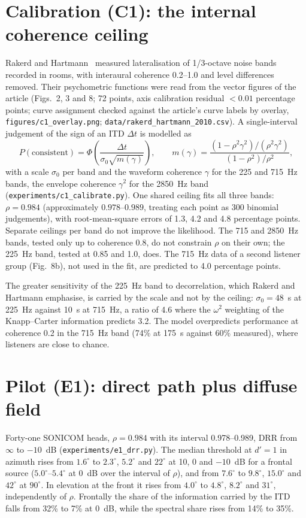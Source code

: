 \documentclass[10pt]{article}
\theoremstyle{definition}
\begin{document}
\section{Calibration (C1): the internal coherence ceiling}\label{sec:c1}
Rakerd and Hartmann~\cite{rakerd2010} measured lateralisation of 1/3-octave noise bands recorded in rooms, with interaural coherence 0.2--1.0 and level differences removed. Their psychometric functions were read from the vector figures of the article (Figs.~2, 3 and 8; 72 points, axis calibration residual $<0.01$ percentage points; curve assignment checked against the article's curve labels by overlay, \texttt{figures/c1\_overlay.png}; \texttt{data/rakerd\_hartmann\_2010.csv}). A single-interval judgement of the sign of an ITD $\Delta t$ is modelled as
\begin{equation}
P(\text{consistent})=\Phi\!\left(\frac{\Delta t}{\sigma_0\sqrt{m(\gamma)}}\right),\qquad
m(\gamma)=\frac{(1-\rho^2\gamma^2)/(\rho^2\gamma^2)}{(1-\rho^2)/\rho^2},
\end{equation}
with a scale $\sigma_0$ per band and the waveform coherence $\gamma$ for the 225 and 715~Hz bands, the envelope coherence $\gamma^2$ for the 2850~Hz band (\texttt{experiments/c1\_calibrate.py}). One shared ceiling fits all three bands: $\rho=0.984$ (approximately $0.978$--$0.989$, treating each point as 300 binomial judgements), with root-mean-square errors of 1.3, 4.2 and 4.8 percentage points. Separate ceilings per band do not improve the likelihood. The 715 and 2850~Hz bands, tested only up to coherence 0.8, do not constrain $\rho$ on their own; the 225~Hz band, tested at 0.85 and 1.0, does. The 715~Hz data of a second listener group (Fig.~8b), not used in the fit, are predicted to 4.0 percentage points.

The greater sensitivity of the 225~Hz band to decorrelation, which Rakerd and Hartmann emphasise, is carried by the scale and not by the ceiling: $\sigma_0=48$~\textmu s at 225~Hz against 10~\textmu s at 715~Hz, a ratio of 4.6 where the $\omega^2$ weighting of the Knapp--Carter information predicts 3.2. The model overpredicts performance at coherence 0.2 in the 715~Hz band (74\% at 175~\textmu s against 60\% measured), where listeners are close to chance.

\section{Pilot (E1): direct path plus diffuse field}
Forty-one SONICOM heads, $\rho=0.984$ with its interval 0.978--0.989, DRR from $\infty$ to $-10$~dB (\texttt{experiments/e1\_drr.py}). The median threshold at $d'=1$ in azimuth rises from $1.6^\circ$ to $2.3^\circ$, $5.2^\circ$ and $22^\circ$ at 10, 0 and $-10$~dB for a frontal source ($5.0^\circ$--$5.4^\circ$ at 0~dB over the interval of $\rho$), and from $7.6^\circ$ to $9.8^\circ$, $15.0^\circ$ and $42^\circ$ at $90^\circ$. In elevation at the front it rises from $4.0^\circ$ to $4.8^\circ$, $8.2^\circ$ and $31^\circ$, independently of $\rho$. Frontally the share of the information carried by the ITD falls from 32\% to 7\% at 0~dB, while the spectral share rises from 14\% to 35\%.
\end{document}

